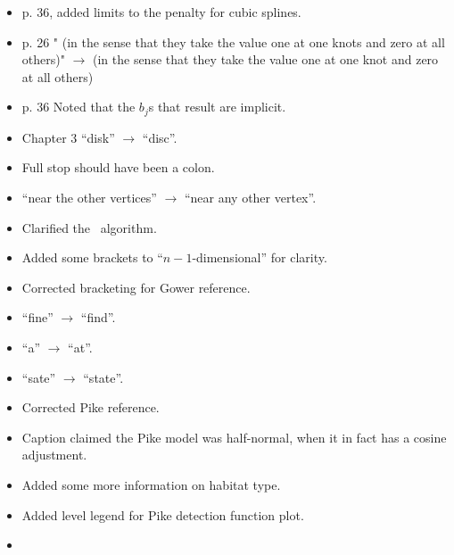 \begin{itemize}
\item p. 36, added limits to the penalty for cubic splines.
\item p. 26 " (in the sense that they take the value one at one knots and zero at all others)" $\rightarrow$  (in the sense that they take the value one at one knot and zero at all others)
\item p. 36 Noted that the $b_j$s that result are implicit.
\item Chapter 3 ``disk'' $\rightarrow$ ``disc''.
\item {} Full stop should have been a colon.
\item {} ``near the other vertices'' $\rightarrow$ ``near any other vertex''.
\item {} Clarified the \sch\ algorithm.
\item {} Added some brackets to ``$n-1$-dimensional'' for clarity.
\item {} Corrected bracketing for Gower reference.
\item {} ``fine'' $\rightarrow$ ``find''.
\item {} ``a'' $\rightarrow$ ``at''.
\item {} ``sate'' $\rightarrow$ ``state''.
\item {} Corrected Pike reference.
\item {} Caption claimed the Pike model was half-normal, when it in fact has a cosine adjustment.
\item {} Added some more information on habitat type.
\item {} Added level legend for Pike detection function plot.
\item {} 
\end{itemize}

